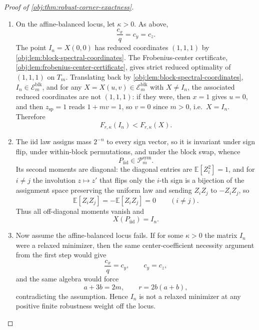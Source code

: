 \begin{proof}[Proof of \cref{obj:thm:robust-corner-exactness}]
\begin{enumerate}
\item On the affine-balanced locus, let \(\kappa>0\).  As above,
\[
\frac{c_x}{q}=c_y=c_z .
\]
The point \(I_n=X(0,0)\) has reduced coordinates \((1,1,1)\) by
\cref{obj:lem:block-spectral-coordinates}.  The Frobenius-center certificate, \cref{obj:lem:frobenius-center-certificate}, gives strict reduced optimality of
\((1,1,1)\) on \(T_m\).  Translating back by
\cref{obj:lem:block-spectral-coordinates}, \(I_n\in\mathcal E_m^{\mathrm{blk}}\), and
for any \(X=X(u,v)\in\mathcal E_m^{\mathrm{blk}}\) with \(X\ne I_n\), the associated
reduced coordinates are not \((1,1,1)\): if they were, then \(x=1\) gives \(u=0\), and then \(z_{\mathrm{sp}}=1\) reads \(1+mv=1\), so \(v=0\) since \(m>0\), i.e.\ \(X=I_n\).  Therefore
\[
F_{r,\kappa}(I_n)<F_{r,\kappa}(X).
\] %

\item The iid law assigns mass \(2^{-n}\) to every sign vector, so it is invariant under
sign flip, under within-block permutations, and under the block swap, whence
\[
P_{\mathrm{iid}}\in\mathcal P_m^{\mathrm{sym}}.
\] %
Its second moments are diagonal: the diagonal entries are \(\mathbb E[Z_i^2]=1\), and for \(i\ne j\)
the involution \(z\mapsto z'\) that flips only the \(i\)-th sign is a bijection of the
assignment space preserving the uniform law and sending \(Z_iZ_j\) to \(-Z_iZ_j\), so
\[
\mathbb E[Z_iZ_j]=-\mathbb E[Z_iZ_j]=0
\qquad (i\ne j).
\]
Thus all off-diagonal moments vanish and
\[
X(P_{\mathrm{iid}})=I_n .
\] %

\item Now assume the affine-balanced locus fails.  If for some \(\kappa>0\) the matrix
\(I_n\) were a relaxed minimizer, then the same center-coefficient necessity argument
from the first step would give
\[
\frac{c_x}{q}=c_y,\qquad c_y=c_z,
\]
and the same algebra would force
\[
a+3b=2m,\qquad r=2b(a+b),
\]
contradicting the assumption.  Hence \(I_n\) is not a relaxed minimizer at any positive
finite robustness weight off the locus. %


\end{enumerate}
\end{proof}
